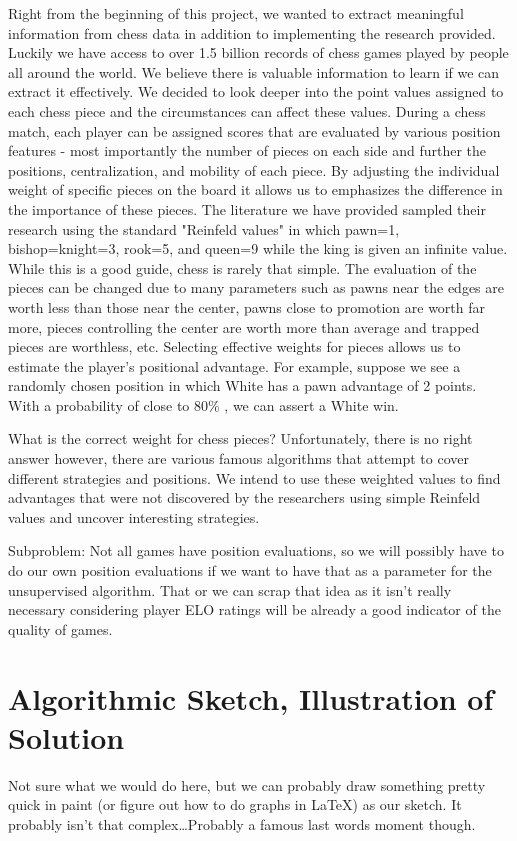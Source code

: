 \documentclass[12pt]{article}
\begin{document}
    Right from the beginning of this project, we wanted to extract meaningful information from chess data in addition to implementing the research provided. Luckily we have access to over 1.5 billion records of chess games played by people all around the world. We believe there is valuable information to learn if we can extract it effectively. We decided to look deeper into the point values assigned to each chess piece and the circumstances can affect these values. During a chess match, each player can be assigned scores that are evaluated by various position features - most importantly the number of pieces on each side and further the positions, centralization, and mobility of each piece. By adjusting the individual weight of specific pieces on the board it allows us to emphasizes the difference in the importance of these pieces. The literature we have provided sampled their research using the standard "Reinfeld values" in which pawn=1, bishop=knight=3, rook=5, and queen=9 while the king is given an infinite value. While this is a good guide, chess is rarely that simple. The evaluation of the pieces can be changed due to many parameters such as pawns near the edges are worth less than those near the center, pawns close to promotion are worth far more, pieces controlling the center are worth more than average and trapped pieces are worthless, etc. Selecting effective weights for pieces allows us to estimate the player's positional advantage. For example, suppose we see a randomly chosen position in which White has a pawn advantage of 2 points. With a probability of close to 80\% , we can assert a White win. 

    What is the correct weight for chess pieces? Unfortunately, there is no right answer however, there are various famous algorithms that attempt to cover different strategies and positions. We intend to use these weighted values to find advantages that were not discovered by the researchers using simple Reinfeld values and uncover interesting strategies. 
    

    Subproblem: Not all games have position evaluations, so we will possibly have to do our own position evaluations if we want to have that as a parameter for the unsupervised algorithm. That or we can scrap that idea as it isn't really necessary considering player ELO ratings will be already a good indicator of the quality of games.    


    \section{Algorithmic Sketch, Illustration of Solution}

    Not sure what we would do here, but we can probably draw something pretty quick in paint (or figure out how to do graphs in \LaTeX) as our sketch. It probably isn't that complex\dots Probably a famous last words moment though.

    \printbibliography
    
\end{document}
